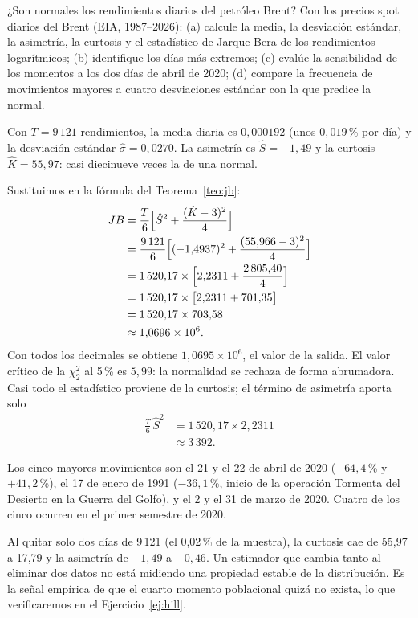 \begin{ejresuelto}{¿Son normales los rendimientos diarios del petróleo Brent?}\label{ej:brentnormal}
\enunciado Con los precios spot diarios del Brent (EIA, 1987--2026): (a) calcule la media, la desviación
estándar, la asimetría, la curtosis y el estadístico de Jarque-Bera de los rendimientos logarítmicos;
(b) identifique los días más extremos; (c) evalúe la sensibilidad de los momentos a los dos días de abril
de 2020; (d) compare la frecuencia de movimientos mayores a cuatro desviaciones estándar con la que
predice la normal.

\solucion
{} Con $T=9\,121$ rendimientos, la media diaria es $0{,}000192$ (unos
$0{,}019$\,\% por día) y la desviación estándar $\hat\sigma=0{,}0270$. La asimetría es $\hat S=-1{,}49$ y
la curtosis $\hat K=55{,}97$: casi diecinueve veces la de una normal.

 Sustituimos en la fórmula del Teorema~\ref{teo:jb}:
\begin{align*}
  JB &= \frac{T}{6}\Bigl[\hat S^2+\frac{(\hat K-3)^2}{4}\Bigr]\\
     &= \frac{9\,121}{6}\Bigl[(-1{,}4937)^2+\frac{(55{,}966-3)^2}{4}\Bigr]\\
     &= 1\,520{,}17\times\Bigl[2{,}2311+\frac{2\,805{,}40}{4}\Bigr]\\
     &= 1\,520{,}17\times\bigl[2{,}2311+701{,}35\bigr]\\
     &= 1\,520{,}17\times703{,}58\\
     &\approx 1{,}0696\times10^{6}.
\end{align*}
Con todos los decimales se obtiene $1{,}0695\times10^{6}$, el valor de la salida. El valor crítico de la
$\chi^2_2$ al 5\,\% es $5{,}99$: la normalidad se rechaza de forma abrumadora. Casi todo el estadístico
proviene de la curtosis; el término de asimetría aporta solo
\begin{align*}
  \frac{T}{6}\,\hat S^2 &= 1\,520{,}17\times2{,}2311\\
                        &\approx 3\,392 .
\end{align*}

 Los cinco mayores movimientos son el 21 y el 22 de abril de 2020
($-64{,}4$\,\% y $+41{,}2$\,\%), el 17 de enero de 1991 ($-36{,}1$\,\%, inicio de la operación Tormenta
del Desierto en la Guerra del Golfo), y el 2 y el 31 de marzo de 2020. Cuatro de los cinco ocurren en
el primer semestre de 2020.

 Al quitar solo dos días de 9\,121 (el 0,02\,\% de la muestra), la
curtosis cae de 55,97 a 17,79 y la asimetría de $-1{,}49$ a $-0{,}46$. Un estimador que cambia tanto al
eliminar dos datos no está midiendo una propiedad estable de la distribución. Es la señal empírica de
que el cuarto momento poblacional quizá no exista, lo que verificaremos en el Ejercicio~\ref{ej:hill}.


\end{ejresuelto}
